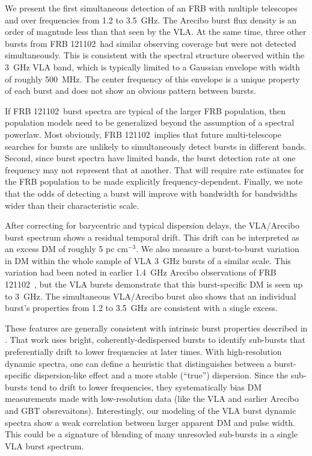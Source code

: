 \documentclass[twocolumn]{aastex61}
\newcommand{\frb}{FRB 121102}
\begin{document}
We present the first simultaneous detection of an FRB with multiple telescopes and over frequencies from 1.2 to 3.5~GHz. The Arecibo burst flux density is an order of magntude less than that seen by the VLA. At the same time, three other bursts from \frb\ had similar observing coverage but were not detected simultaneously. This is consistent with the spectral structure observed within the 3~GHz VLA band, which is typically limited to a Gaussian envelope with width of roughly 500~MHz. The center frequency of this envelope is a unique property of each burst and does not show an obvious pattern between bursts.

If \frb\ burst spectra are typical of the larger FRB population, then population models need to be generalized beyond the assumption of a spectral powerlaw. Most obviously, \frb\ implies that future multi-telescope searches for bursts are unlikely to simultaneously detect bursts in different bands. Second, since burst spectra have limited bands, the burst detection rate at one frequency may not represent that at another. That will require rate estimates for the FRB population to be made explicitly frequency-dependent. Finally, we note that the odds of detecting a burst will improve with bandwidth for bandwidths wider than their characteristic scale.

After correcting for barycentric and typical dispersion delays, the VLA/Arecibo burst spectrum shows a residual temporal drift. This drift can be interpreted as an excess DM of roughly 5 pc cm$^{-3}$. We also measure a burst-to-burst variation in DM within the whole sample of VLA 3~GHz bursts of a similar scale. This variation had been noted in earlier 1.4~GHz Arecibo observations of \frb\ \citep{2016arXiv160308880S}, but the VLA bursts demonstrate that this burst-specific DM is seen up to 3~GHz. The simultaneous VLA/Arecibo burst also shows that an individual burst's properties from 1.2 to 3.5~GHz are consistent with a single excess. 

These features are generally consistent with intrinsic burst properties described in \citet{WEIRD}. That work uses bright, coherently-dedispersed bursts to identify sub-bursts that preferentially drift to lower frequencies at later times. With high-resolution dynamic spectra, one can define a heuristic that distinguishes between a burst-specific dispersion-like effect and a more stable (``true'') dispersion. Since the sub-bursts tend to drift to lower frequencies, they systematically bias DM measurements made with low-resolution data (like the VLA and earlier Arecibo and GBT obsrevaitons). Interestingly, our modeling of the VLA burst dynamic spectra show a weak correlation between larger apparent DM and pulse width. This could be a signature of blending of many unresovled sub-bursts in a single VLA burst spectrum.
\end{document}
